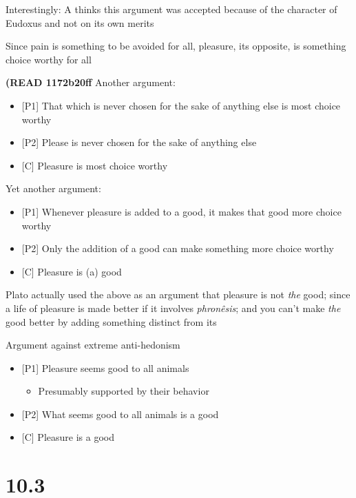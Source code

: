\documentclass[11pt]{article}
\begin{document}
\noindent Interestingly: A thinks this argument was accepted because of the character of Eudoxus and not on its own merits
\vspace*{2mm}

\noindent Since pain is something to be avoided for all, pleasure, its opposite, is something choice worthy for all
\vspace*{2mm}

\noindent \textbf{(READ 1172b20ff} Another argument:

\begin{itemize}\item{[P1] That which is never chosen for the sake of anything else is most choice worthy}\item{[P2] Please is never chosen for the sake of anything else}\item{[C] Pleasure is most choice worthy}\end{itemize}

\noindent Yet another argument:

\begin{itemize}\item{[P1] Whenever pleasure is added to a good, it makes that good more choice worthy}\item{[P2] Only the addition of a good can make something more choice worthy}\item{[C] Pleasure is (a) good}\end{itemize}

\noindent Plato actually used the above as an argument that pleasure is not \emph{the} good; since a life of pleasure is made better if it involves \emph{phron\^{e}sis}; and you can't make \emph{the} good better by adding something distinct from its
\vspace*{2mm}

\noindent Argument against extreme anti-hedonism

\begin{itemize}\item{[P1] Pleasure seems good to all animals}\begin{itemize}\item{Presumably supported by their behavior}\end{itemize}\item{[P2] What seems good to all animals is a good}\item{[C] Pleasure is a good}\end{itemize}

\section{10.3}
\end{document}
